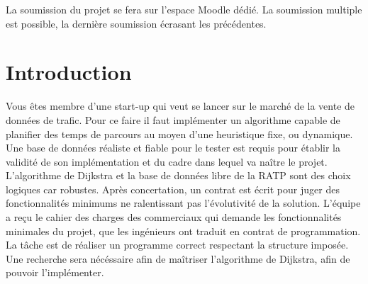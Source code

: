 \documentclass[9pts]{article}
\renewcommand{\headrulewidth}{0pt}
\begin{document}
La soumission du projet se fera sur l'espace Moodle dédié. La soumission multiple est possible, la dernière soumission écrasant les précédentes.

\pagebreak
\renewcommand{\headrulewidth}{0.5pt}
\fancyfoot[C]{\thepage}

\section{Introduction}
Vous êtes membre d'une start-up qui veut se lancer sur le marché de la vente de données de trafic.
Pour ce faire il faut implémenter un algorithme capable de planifier des temps de parcours au moyen d'une heuristique fixe, ou dynamique.
Une base de données réaliste et fiable pour le tester est requis pour établir la validité de son implémentation et du cadre dans lequel va naître le projet.
L'algorithme de Dijkstra et la base de données libre de la RATP sont des choix logiques car robustes.
Après concertation, un contrat est écrit pour juger des fonctionnalités minimums ne ralentissant pas l'évolutivité de la solution.
L'équipe a reçu le cahier des charges des commerciaux qui demande les fonctionnalités minimales du projet, que les ingénieurs ont traduit en contrat de programmation. La tâche est de réaliser un programme correct respectant la structure imposée. Une recherche sera nécéssaire afin de maîtriser l'algorithme de Dijkstra, afin de pouvoir l'implémenter.
\end{document}
